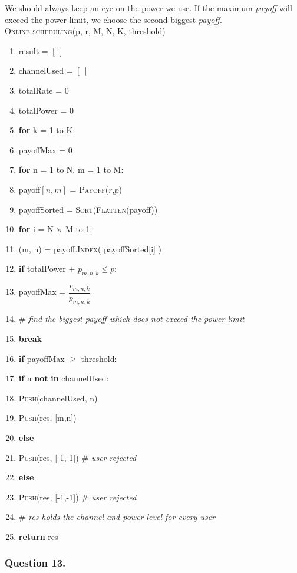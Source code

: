 \documentclass[11pt, oneside]{report}
\begin{document}
We should always keep an eye on the power we use. If the maximum \textit{payoff} will exceed the power limit, we choose the second biggest \textit{payoff}. \\

\noindent\textsc{Online-scheduling}(p, r, M, N, K, threshold)
\begin{enumerate}[1\ ]
\setlength{\topsep}{0.05ex}
\setlength{\itemsep}{0.05ex}
\item result = $[\ ]$
\item channelUsed  = $[\ ]$
\item totalRate = 0
\item totalPower = 0
\item \textbf{for} k = 1 to K:
\item \qquad payoffMax = 0 
\item \qquad \textbf{for} n = 1 to N, m = 1 to M:
\item \qquad \qquad payoff$[n, m]$ = \textsc{Payoff}($r$,$p$)
\item \qquad payoffSorted = \textsc{Sort}(\textsc{Flatten}(payoff))
\item \qquad \textbf{for} i = N $\times$ M to 1:
\item \qquad \qquad (m, n) = payoff.\textsc{Index}( payoffSorted[i] )
\item \qquad \qquad \textbf{if} totalPower + $p_{m,n,k} \leq p$:
\item \qquad \qquad \qquad payoffMax = $\dfrac{r_{m,n,k}}{p_{m,n,k}}$
\item \qquad \qquad \qquad $\#$ \textit{find the biggest payoff which does not exceed the power limit}
\item \qquad \qquad \qquad \textbf{break}
\item \qquad \textbf{if} payoffMax $\geq$ threshold:
\item \qquad \qquad \textbf{if} n \textbf{not} \textbf{in} channelUsed:
\item \qquad \qquad \qquad \textsc{Push}(channelUsed, n) 
\item \qquad \qquad \qquad \textsc{Push}(res, [m,n])
\item \qquad \qquad \textbf{else}
\item \qquad \qquad \qquad \textsc{Push}(res, [-1,-1])   \textit{$\#$ user rejected}
\item \qquad \textbf{else}
\item \qquad \qquad \textsc{Push}(res, [-1,-1])   \textit{$\#$ user rejected}
\item $\#$ \textit{res holds the channel and power level for every user}
\item \textbf{return} res
\end{enumerate}

\subsubsection{Question 13. }
\end{document}

